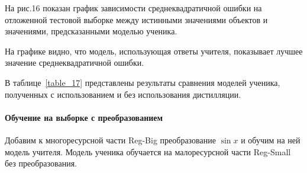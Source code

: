 На рис.16 показан график зависимости среднеквадратичной ошибки на отложенной тестовой выборке между истинными значениями объектов и значениями, предсказанными моделью ученика.

На графике видно, что модель, использующая ответы учителя, показывает лучшее значение среднеквадратичной ошибки.

\begin{table}[h!t]
\begin{center}
\caption{Качество моделей}
\label{table_17}
\end{center}
\end{table}

В таблице~\ref{table_17} представлены результаты сравнения моделей ученика, полученных с использованием и без использования дистилляции.

\paragraph{Обучение на выборке с преобразованием}
Добавим к многоресурсной части Reg-Big преобразование $\sin{x}$ и обучим на ней модель учителя. Модель ученика обучается на малоресурсной части Reg-Small без преобразования.

